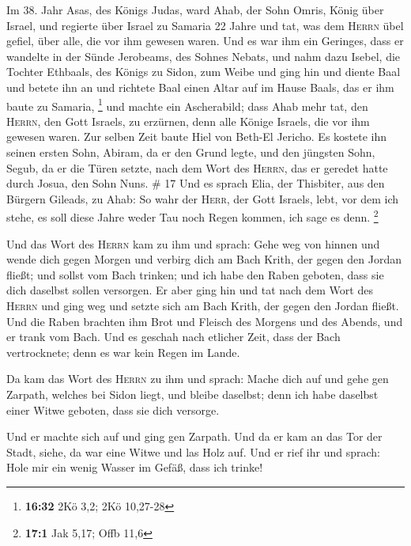  Im 38. Jahr Asas, des Königs Judas, ward Ahab, der Sohn
Omris, König über Israel, und regierte über Israel zu Samaria 22 Jahre
 und tat, was dem \textsc{Herrn} übel gefiel, über alle,
die vor ihm gewesen waren.  Und es war ihm ein Geringes,
dass er wandelte in der Sünde Jerobeams, des Sohnes Nebats, und nahm
dazu Isebel, die Tochter Ethbaals, des Königs zu Sidon, zum Weibe und
ging hin und diente Baal und betete ihn an  und richtete
Baal einen Altar auf im Hause Baals, das er ihm baute zu Samaria,
\footnote{\textbf{16:32} 2Kö 3,2; 2Kö 10,27-28}  und
machte ein Ascherabild; dass Ahab mehr tat, den \textsc{Herrn}, den Gott
Israels, zu erzürnen, denn alle Könige Israels, die vor ihm gewesen
waren.  Zur selben Zeit baute Hiel von Beth-El Jericho.
Es kostete ihn seinen ersten Sohn, Abiram, da er den Grund legte, und
den jüngsten Sohn, Segub, da er die Türen setzte, nach dem Wort des
\textsc{Herrn}, das er geredet hatte durch Josua, den Sohn Nuns. \# 17
 Und es sprach Elia, der Thisbiter, aus den Bürgern
Gileads, zu Ahab: So wahr der \textsc{Herr}, der Gott Israels, lebt, vor
dem ich stehe, es soll diese Jahre weder Tau noch Regen kommen, ich sage
es denn. \footnote{\textbf{17:1} Jak 5,17; Offb 11,6}

 Und das Wort des \textsc{Herrn} kam zu ihm und sprach:
 Gehe weg von hinnen und wende dich gegen Morgen und
verbirg dich am Bach Krith, der gegen den Jordan fließt; 
und sollst vom Bach trinken; und ich habe den Raben geboten, dass sie
dich daselbst sollen versorgen.  Er aber ging hin und tat
nach dem Wort des \textsc{Herrn} und ging weg und setzte sich am Bach
Krith, der gegen den Jordan fließt.  Und die Raben
brachten ihm Brot und Fleisch des Morgens und des Abends, und er trank
vom Bach.  Und es geschah nach etlicher Zeit, dass der
Bach vertrocknete; denn es war kein Regen im Lande.

 Da kam das Wort des \textsc{Herrn} zu ihm und sprach:
 Mache dich auf und gehe gen Zarpath, welches bei Sidon
liegt, und bleibe daselbst; denn ich habe daselbst einer Witwe geboten,
dass sie dich versorge.

 Und er machte sich auf und ging gen Zarpath. Und da er
kam an das Tor der Stadt, siehe, da war eine Witwe und las Holz auf. Und
er rief ihr und sprach: Hole mir ein wenig Wasser im Gefäß, dass ich
trinke!


